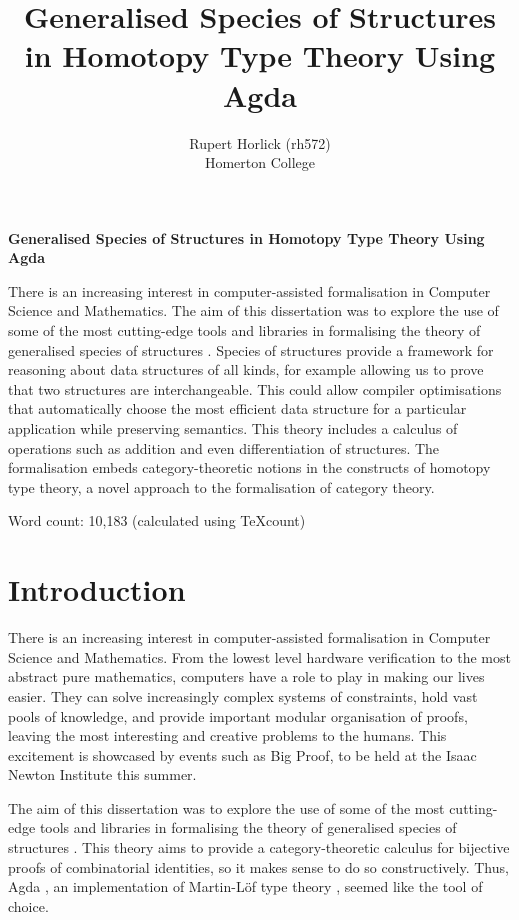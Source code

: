 \documentclass[12pt, parskip, DIV=14]{scrbook}
\title{Generalised Species of Structures in Homotopy Type Theory Using Agda}
\author{Rupert Horlick (rh572) \\
  \large Homerton College }
\date{}
\begin{document}
\frontmatter

\maketitle


\textbf{Generalised Species of Structures in Homotopy Type Theory Using Agda}

There is an increasing interest in computer-assisted formalisation in Computer Science and Mathematics. The aim of this dissertation was to explore the use of some of the most cutting-edge tools and libraries in formalising the theory of generalised species of structures \citep{fiore2008cartesian}. Species of structures provide a framework for reasoning about data structures of all kinds, for example allowing us to prove that two structures are interchangeable. This could allow compiler optimisations that automatically choose the most efficient data structure for a particular application while preserving semantics. This theory includes a calculus of operations such as addition and even differentiation of structures. The formalisation embeds category-theoretic notions in the constructs of homotopy type theory, a novel approach to the formalisation of category theory.

\newpage

Word count: 10,183 (calculated using TeXcount)

\tableofcontents

\mainmatter

\chapter{Introduction}
\label{chap:intro}

There is an increasing interest in computer-assisted formalisation in Computer Science and Mathematics. From the lowest level hardware verification to the most abstract pure mathematics, computers have a role to play in making our lives easier. They can solve increasingly complex systems of constraints, hold vast pools of knowledge, and provide important modular organisation of proofs, leaving the most interesting and creative problems to the humans. This excitement is showcased by events such as Big Proof, to be held at the Isaac Newton Institute this summer.

The aim of this dissertation was to explore the use of some of the most cutting-edge tools and libraries in formalising the theory of generalised species of structures \citep{fiore2008cartesian}. This theory aims to provide a category-theoretic calculus for bijective proofs of combinatorial identities, so it makes sense to do so constructively. Thus, Agda \citep{norell2007towards}, an implementation of Martin-L\"of type theory \citep{martin1975intuitionistic}, seemed like the tool of choice.
\end{document}
